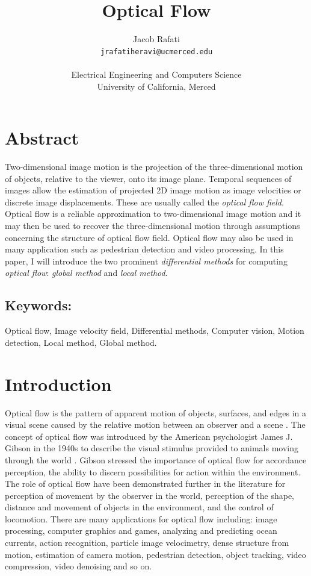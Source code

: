 \documentclass[letterpaper,11pt]{article}
\title{\Huge \textbf{Optical Flow}}
\author{
  \Large Jacob Rafati\\ \texttt{jrafatiheravi@ucmerced.edu}\\
  \\  Electrical Engineering and Computers Science\\  
   University of California, Merced
}
\begin{document}
\maketitle

\tableofcontents

\section*{Abstract}
Two-dimensional image motion is the projection of the three-dimensional motion of objects, relative to the viewer, onto its image plane. Temporal sequences of images allow the estimation of projected 2D image motion as image velocities or discrete image displacements. These are usually
called the \emph{optical flow field}. Optical flow is a reliable approximation to two-dimensional image motion and it may then be used to recover the three-dimensional motion through assumptions concerning the structure of optical flow field. Optical flow may also be used in many application such as pedestrian detection and video processing. In this paper, I will introduce the two prominent \emph{differential methods} for computing \emph{optical flow}: \emph{global method} and \emph{local method}. 

\subsection*{Keywords:} Optical flow, Image velocity field, Differential methods, Computer vision, Motion detection, Local method, Global method.

\section{Introduction} 
\label{sec:introduction}
Optical flow is the pattern of apparent motion of objects, surfaces, and edges in a visual scene caused by the relative motion between an observer and a scene \citep{Horn:Schunck:1981}. The concept of optical flow was introduced by the American psychologist James J. Gibson in the 1940s to describe the visual stimulus provided to animals moving through the world \citep{Gibson:1979}. Gibson stressed the importance of optical flow for accordance perception, the ability to discern possibilities for action within the environment. The role of optical flow have been demonstrated further in the literature for perception of movement by the observer in the world, perception of the shape, distance and movement of objects in the environment, and the control of locomotion. There are many applications for optical flow including: image processing, computer graphics and games, analyzing and predicting ocean currents, action recognition, particle image velocimetry, dense structure from motion, estimation of camera motion, pedestrian detection, object tracking, video compression, video denoising and so on. 
\end{document}
